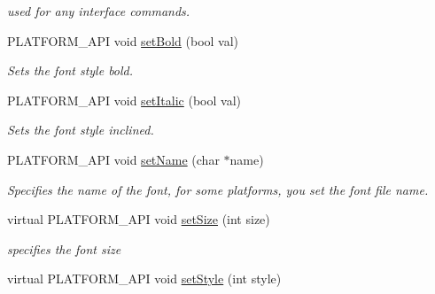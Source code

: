 \begin{DoxyCompactItemize}
\begin{DoxyCompactList}\small\item\em used for any interface commands. \end{DoxyCompactList}\item 
\hypertarget{classcsad_1_1_font_a10c9c756fc9fa5956b9466c9c15e9d13}{P\-L\-A\-T\-F\-O\-R\-M\-\_\-\-A\-P\-I void \hyperlink{classcsad_1_1_font_a10c9c756fc9fa5956b9466c9c15e9d13}{set\-Bold} (bool val)}\label{classcsad_1_1_font_a10c9c756fc9fa5956b9466c9c15e9d13}

\begin{DoxyCompactList}\small\item\em Sets the font style bold. \end{DoxyCompactList}\item 
\hypertarget{classcsad_1_1_font_afb80f95ef52ae2d3f8ab5efd7e57006b}{P\-L\-A\-T\-F\-O\-R\-M\-\_\-\-A\-P\-I void \hyperlink{classcsad_1_1_font_afb80f95ef52ae2d3f8ab5efd7e57006b}{set\-Italic} (bool val)}\label{classcsad_1_1_font_afb80f95ef52ae2d3f8ab5efd7e57006b}

\begin{DoxyCompactList}\small\item\em Sets the font style inclined. \end{DoxyCompactList}\item 
\hypertarget{classcsad_1_1_font_a5e2ec165289b5e809936dde5d0913f16}{P\-L\-A\-T\-F\-O\-R\-M\-\_\-\-A\-P\-I void \hyperlink{classcsad_1_1_font_a5e2ec165289b5e809936dde5d0913f16}{set\-Name} (char $\ast$name)}\label{classcsad_1_1_font_a5e2ec165289b5e809936dde5d0913f16}

\begin{DoxyCompactList}\small\item\em Specifies the name of the font, for some platforms, you set the font file name. \end{DoxyCompactList}\item 
\hypertarget{classcsad_1_1_font_ac1e1cc4a00300465b733911acacbed65}{virtual P\-L\-A\-T\-F\-O\-R\-M\-\_\-\-A\-P\-I void \hyperlink{classcsad_1_1_font_ac1e1cc4a00300465b733911acacbed65}{set\-Size} (int size)}\label{classcsad_1_1_font_ac1e1cc4a00300465b733911acacbed65}

\begin{DoxyCompactList}\small\item\em specifies the font size \end{DoxyCompactList}\item 
\hypertarget{classcsad_1_1_font_a4ac8d96b47c91cf8edf047ddc819158b}{virtual P\-L\-A\-T\-F\-O\-R\-M\-\_\-\-A\-P\-I void \hyperlink{classcsad_1_1_font_a4ac8d96b47c91cf8edf047ddc819158b}{set\-Style} (int style)}\label{classcsad_1_1_font_a4ac8d96b47c91cf8edf047ddc819158b}


\end{DoxyCompactItemize}
